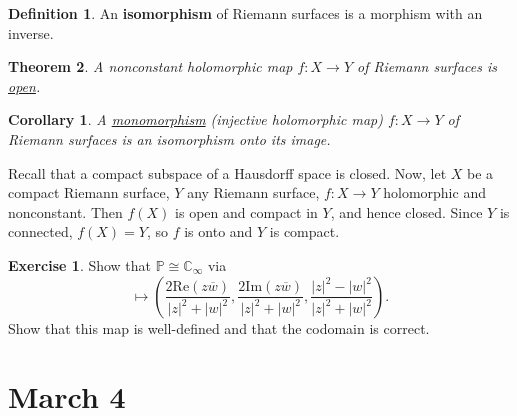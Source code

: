 \documentclass[12pt]{article}
\newcommand{\cx}{\mathbb{C}}
\newcommand{\p}{\mathbb{P}}
\newtheorem{theorem}{Theorem}[section]
\newtheorem{corollary}{Corollary}[theorem]
\theoremstyle{definition}
\newtheorem{definition}[theorem]{Definition}
\newtheorem{exercise}{Exercise}
\theoremstyle{remark}
\begin{document}
\begin{definition}
    An \textbf{isomorphism} of Riemann surfaces is a morphism with an inverse.
\end{definition}
\begin{theorem}
    A nonconstant holomorphic map $f : X \to Y$ of Riemann surfaces is \underline{open}.
\end{theorem}
\begin{corollary}
    A \underline{monomorphism} (injective holomorphic map) $f : X \to Y$ of Riemann surfaces is an isomorphism onto its image.
\end{corollary}
Recall that a compact subspace of a Hausdorff space is closed. Now, let $X$ be a compact Riemann surface, $Y$ any Riemann surface, $f : X \to Y$ holomorphic and nonconstant. Then $f(X)$ is open and compact in $Y$, and hence closed. Since $Y$ is connected, $f(X) = Y$, so $f$ is onto and $Y$ is compact.
\begin{exercise}
    Show that $\p \cong \cx_{\infty}$ via 
    \begin{equation}
        [z , w] \mapsto \left( \frac{2 \mathrm{Re}( z \overline{w} )}{|z|^2 + |w|^2} , \frac{2 \mathrm{Im}( z \overline{w} )}{|z|^2 + |w|^2} , \frac{|z|^2 - |w|^2}{|z|^2 + |w|^2} \right).
    \end{equation}
    Show that this map is well-defined and that the codomain is correct.
\end{exercise}
\section{March 4}
\end{document}
